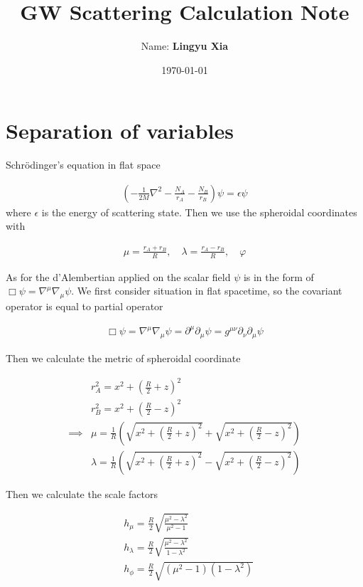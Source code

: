 \documentclass[11pt]{diazessay} %
\title{\textbf{GW Scattering Calculation Note}} %
\author{Name: \textbf{Lingyu Xia}} %
\date{\today} %
\begin{document}
\maketitle

\section{Separation of variables}

Schrödinger's equation in flat space

\begin{align}
    \left(-\frac{1}{2M}\nabla^2-\frac{N_A}{r_A}-\frac{N_B}{r_B}\right)\psi=\epsilon \psi
\end{align}
where $\epsilon$ is the energy of scattering state. Then we use the spheroidal coordinates with 

\begin{align}
    \mu =\frac{r_A+r_B}{R},\quad \lambda =\frac{r_A-r_B}{R},\quad \varphi
\end{align}

As for the d'Alembertian applied on the scalar field $\psi$ is in the form of $\Box \psi=\nabla ^\mu \nabla_\mu \psi$. We first consider situation in flat spacetime, so the covariant operator is equal to partial operator

\begin{align}
    \Box \psi=\nabla ^\mu \nabla_\mu \psi= \partial^\mu \partial _\mu \psi=g^{\mu\nu}\partial_\nu \partial _\mu \psi
\end{align}

Then we calculate the metric of spheroidal coordinate 

\begin{align}
    &r^2_A=x^2+(\frac{R}{2}+z)^2\\
    &r^2_B=x^2+(\frac{R}{2}-z)^2\\
    \implies&\mu=\frac{1}{R}\left(\sqrt{x^2+(\frac{R}{2}+z)^2}+\sqrt{x^2+(\frac{R}{2}-z)^2}\right)\\
    &\lambda=\frac{1}{R}\left(\sqrt{x^2+(\frac{R}{2}+z)^2}-\sqrt{x^2+(\frac{R}{2}-z)^2}\right)
\end{align}

Then we calculate the scale factors

\begin{align}
    &h_\mu=\frac{R}{2}\sqrt{\frac{\mu^2-\lambda^2}{\mu^2-1}}\\
    &h_\lambda=\frac{R}{2}\sqrt{\frac{\mu^2-\lambda^2}{1-\lambda^2}}\\
    &h_\phi=\frac{R}{2}\sqrt{(\mu^2-1)(1-\lambda^2)}
\end{align}
\end{document}
